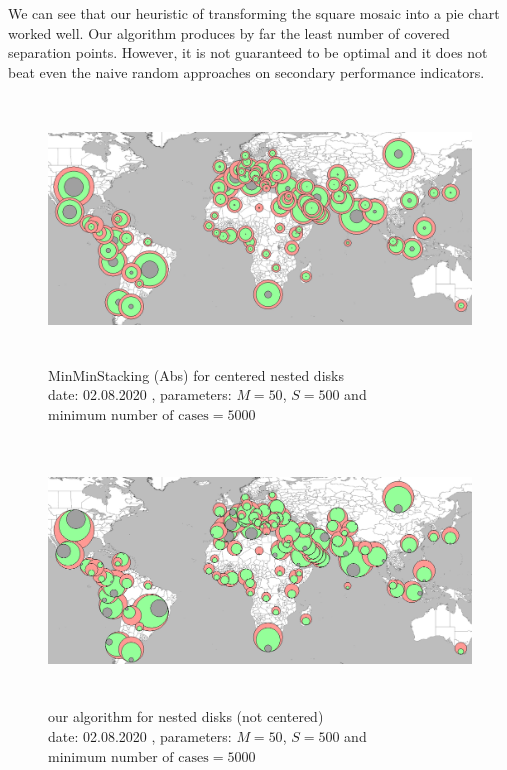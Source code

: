 \documentclass[a4paper,11pt]{article}
\begin{document}
We can see that our heuristic of transforming the square mosaic into a pie chart worked well. Our algorithm produces by far the least number of covered separation points. However, it is not guaranteed to be optimal and it does not beat even the naive random approaches on secondary performance indicators.

\newpage

\begin{figure}[h]
  \centering
  \includegraphics[height=7cm]{assets/MinMinAbsEval}
  \caption{MinMinStacking (Abs) for centered nested disks\\
    date: 02.08.2020  , parameters: $M=50$, $S=500$ and $\text{minimum number of cases}=5000$  }
\end{figure}

\begin{figure}[h]
  \centering
  \includegraphics[height=7cm]{assets/HawaiianEval}
  \caption{our algorithm for nested disks (not centered)\\
    date: 02.08.2020  , parameters: $M=50$, $S=500$ and $\text{minimum number of cases}=5000$  }
\end{figure}
\end{document}
